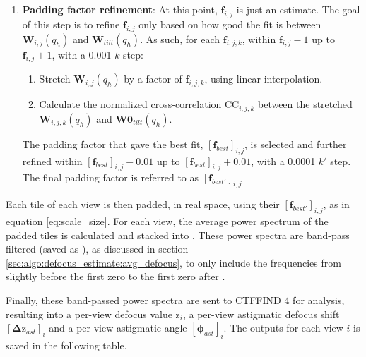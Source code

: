 \begin{enumerate}
    \item \textbf{Padding factor refinement}: At this point, $\bm{f}_{i,j}$ is just an estimate. The goal of this step is to refine $\bm{f}_{i,j}$ only based on how good the fit is between $\bm{W}_{i,j}(q_h)$ and $\bm{W}_{tilt}(q_h)$. As such, for each $\bm{f}_{i,j,k}$, within $\bm{f}_{i,j}-1$ up to $\bm{f}_{i,j}+1$, with a 0.001 $k$ step:
    \begin{enumerate}
        \item Stretch $\bm{W}_{i,j}(q_h)$ by a factor of $\bm{f}_{i,j,k}$, using linear interpolation.
        \item Calculate the normalized cross-correlation $\bm{\mathrm{CC}}_{i,j,k}$ between the stretched $\bm{W}_{i,j,k}(q_h)$ and $\bm{W0}_{tilt}(q_h)$.
    \end{enumerate}
    The padding factor that gave the best fit, ${[\bm{f}_{best}]}_{i,j}$, is selected and further refined within ${[\bm{f}_{best}]}_{i,j}-0.01$ up to ${[\bm{f}_{best}]}_{i,j}+0.01$, with a 0.0001 $k'$ step. The final padding factor is referred to as ${[\bm{f}_{best'}]}_{i,j}$
\end{enumerate}

Each tile of each view is then padded, in real space, using their ${[\bm{f}_{best'}]}_{i,j}$, as in equation \ref{eq:scale_size}. For each view, the average power spectrum of the padded tiles is calculated and stacked into . These power spectra are band-pass filtered (saved as ), as discussed in section \ref{sec:algo:defocus_estimate:avg_defocus}, to only include the frequencies from slightly before the first zero to the first zero after .

Finally, these band-passed power spectra are sent to \href{https://grigoriefflab.umassmed.edu/ctffind4}{CTFFIND 4} for analysis, resulting into a per-view defocus value $\bm{\mathrm{z}}_{i}$, a per-view astigmatic defocus shift ${[\bm{\Delta\mathrm{z}}_{ast}]}_{i}$ and a per-view astigmatic angle ${[\bm{\phi}_{ast}]}_{i}$. The outputs for each view $i$ is saved in the following table.

